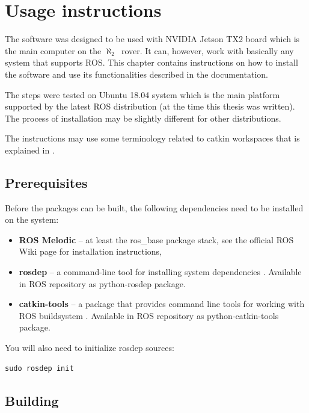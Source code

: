 \documentclass[english,inz,shortabstract]{iithesis}
\newcommand{\val}[1]{\textbf{\textsf{#1}}}
\newcommand{\rovername}{$\aleph_2$\ }
\begin{document}
\chapter{Usage instructions}
The software was designed to be used with \textsf{NVIDIA Jetson TX2} board which is the main computer on the \rovername rover. It can, however, work with basically any system that supports ROS. This chapter contains instructions on how to install the software and use its functionalities described in the documentation. 

The steps were tested on \textsf{Ubuntu 18.04} system which is the main platform supported by the latest ROS distribution (at the time this thesis was written). The process of installation may be slightly different for other distributions.

The instructions may use some terminology related to catkin workspaces that is explained in \cite{usage:workspace}.

\section{Prerequisites}
Before the packages can be built, the following dependencies need to be installed on the system:

\begin{itemize}
	\item \val{ROS Melodic} -- at least the \textsf{ros\_base} package stack, see the official ROS Wiki page \cite{usage:ros_installation} for installation instructions,
	\item \val{rosdep} -- a command-line tool for installing system dependencies \cite{usage:rosdep}. Available in ROS repository as \textsf{python-rosdep} package.
	\item \val{catkin-tools} -- a package that provides command line tools for working with ROS buildsystem \cite{usage:catkin}. Available in ROS repository as \textsf{python-catkin-tools} package.
\end{itemize}

You will also need to initialize \textsf{rosdep} sources:
\begin{lstlisting}[language=mybash]
sudo rosdep init
\end{lstlisting}


\section{Building}
\end{document}
